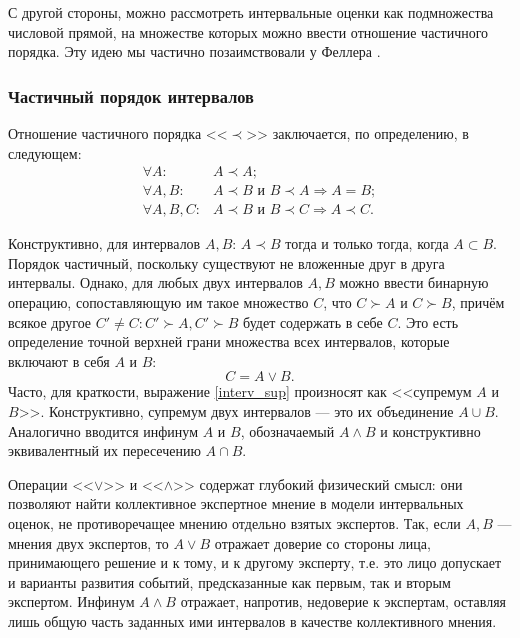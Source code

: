 С другой стороны, можно рассмотреть интервальные оценки как подмножества числовой прямой, на множестве которых можно ввести отношение частичного порядка. Эту идею мы частично позаимствовали у Феллера \cite{cit:feller}.

\subsubsection{Частичный порядок интервалов}

Отношение частичного порядка <<$\prec$>> заключается, по определению, в следующем:
\begin{equation}
\label{interv_order}
\begin{split}
\forall A: & A \prec A; \\
\forall A, B: & A \prec B \text{ и } B \prec A \Rightarrow A = B; \\
\forall A, B, C: & A \prec B \text{ и } B \prec C \Rightarrow A \prec C.
\end{split}
\end{equation}

Конструктивно, для интервалов $A, B$:  $A \prec B$ тогда и только тогда, когда $A \subset B$. Порядок частичный, поскольку существуют не вложенные друг в друга интервалы. Однако, для любых двух интервалов $A, B$ можно ввести бинарную операцию, сопоставляющую им такое множество $C$, что $C \succ A$ и $C \succ B$, причём всякое другое $C' \neq C: C' \succ A, C' \succ B$ будет содержать в себе $C$. Это есть определение точной верхней грани множества всех интервалов, которые включают в себя $A$ и $B$:
\begin{equation}
\label{interv_sup}
 C = A \vee B.
\end{equation}
Часто, для краткости, выражение \eqref{interv_sup} произносят как <<супремум  $A$ и $B$>>. Конструктивно, супремум двух интервалов --- это их объединение $A \cup B$. Аналогично вводится инфинум $A$ и $B$, обозначаемый $A \wedge B$ и конструктивно эквивалентный их пересечению $A \cap B$.

Операции <<$\vee$>> и <<$\wedge$>> содержат глубокий физический смысл: они позволяют найти коллективное экспертное мнение в модели интервальных оценок, не противоречащее мнению отдельно взятых экспертов. Так, если $A, B$ --- мнения двух экспертов, то $A \vee B$ отражает доверие со стороны лица, принимающего решение и к тому, и к другому эксперту, т.е. это лицо допускает и варианты развития событий, предсказанные как первым, так и вторым экспертом. Инфинум  $A \wedge B$ отражает, напротив, недоверие к экспертам, оставляя лишь общую часть заданных ими интервалов в качестве коллективного мнения.

